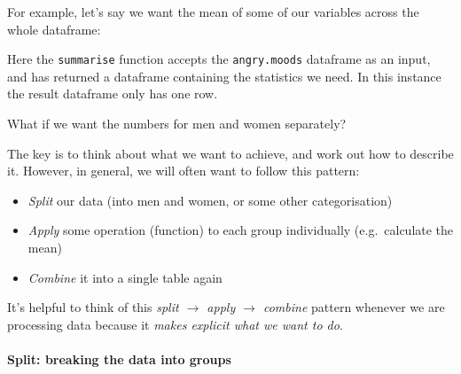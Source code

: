 \documentclass[]{article}
\newenvironment{Shaded}{\begin{snugshade}}{\end{snugshade}}
\newcommand{\CommentTok}[1]{\textcolor[rgb]{0.56,0.35,0.01}{\textit{#1}}}
\newcommand{\DataTypeTok}[1]{\textcolor[rgb]{0.13,0.29,0.53}{#1}}
\newcommand{\DecValTok}[1]{\textcolor[rgb]{0.00,0.00,0.81}{#1}}
\newcommand{\ErrorTok}[1]{\textcolor[rgb]{0.64,0.00,0.00}{\textbf{#1}}}
\newcommand{\FloatTok}[1]{\textcolor[rgb]{0.00,0.00,0.81}{#1}}
\newcommand{\KeywordTok}[1]{\textcolor[rgb]{0.13,0.29,0.53}{\textbf{#1}}}
\newcommand{\NormalTok}[1]{#1}
\newcommand{\OperatorTok}[1]{\textcolor[rgb]{0.81,0.36,0.00}{\textbf{#1}}}
\newcommand{\StringTok}[1]{\textcolor[rgb]{0.31,0.60,0.02}{#1}}
\providecommand{\tightlist}{%
  \setlength{\itemsep}{0pt}\setlength{\parskip}{0pt}}
\let\oldparagraph\paragraph
\renewcommand{\paragraph}[1]{\oldparagraph{#1}\mbox{}}
\begin{document}
For example, let's say we want the mean of some of our variables across the
whole dataframe:

\begin{Shaded}
\end{Shaded}

Here the \texttt{summarise} function accepts the \texttt{angry.moods} dataframe as an input,
and has returned a dataframe containing the statistics we need. In this instance
the result dataframe only has one row.

What if we want the numbers for men and women separately?

The key is to think about what we want to achieve, and work out how to describe
it. However, in general, we will often want to follow this pattern:

\begin{itemize}
\tightlist
\item
  \emph{Split} our data (into men and women, or some other categorisation)
\item
  \emph{Apply} some operation (function) to each group individually (e.g.~calculate
  the mean)
\item
  \emph{Combine} it into a single table again
\end{itemize}

It's helpful to think of this \emph{split \(\rightarrow\) apply \(\rightarrow\) combine}
pattern whenever we are processing data because it \emph{makes explicit what we want
to do}.

\hypertarget{split-breaking-the-data-into-groups}{%
\paragraph{Split: breaking the data into groups}\label{split-breaking-the-data-into-groups}}
\end{document}
